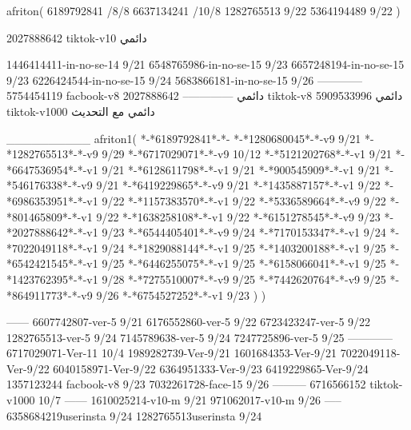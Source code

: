 afriton(
6189792841 /8/8
6637134241 /10/8
1282765513 9/22
5364194489 9/22
)

2027888642 tiktok-v10
دائمي



1446414411-in-no-se-14 9/21
6548765986-in-no-se-15 9/23
6657248194-in-no-se-15 9/23
6226424544-in-no-se-15 9/24
5683866181-in-no-se-15 9/26
------------
5754454119 facbook-v8
دائمي
--------------
2027888642 tiktok-v8
دائمي
5909533996 tiktok-v1000
دائمي مع التحديث

__________
afriton1(
*-*6189792841*-*-
*-*1280680045*-*-v9 9/21
*-*1282765513*-*-v9 9/29
*-*6717029071*-*-v9 10/12
*-*5121202768*-*-v1 9/21
*-*6647536954*-*-v1 9/21
*-*6128611798*-*-v1 9/21
*-*900545909*-*-v1 9/21
*-*546176338*-*-v9 9/21
*-*6419229865*-*-v9 9/21
*-*1435887157*-*-v1 9/22
*-*6986353951*-*-v1 9/22
*-*1157383570*-*-v1 9/22
*-*5336589664*-*-v9 9/22
*-*801465809*-*-v1 9/22
*-*1638258108*-*-v1 9/22
*-*6151278545*-*-v9 9/23
*-*2027888642*-*-v1 9/23
*-*6544405401*-*-v9 9/24
*-*7170153347*-*-v1 9/24
*-*7022049118*-*-v1 9/24
*-*1829088144*-*-v1 9/25
*-*1403200188*-*-v1 9/25
*-*6542421545*-*-v1 9/25
*-*6446255075*-*-v1 9/25
*-*6158066041*-*-v1 9/25
*-*1423762395*-*-v1 9/28
*-*7275510007*-*-v9 9/25
*-*7442620764*-*-v9 9/25
*-*864911773*-*-v9 9/26
*-*6754527252*-*-v1 9/23
)
)

------
6607742807-ver-5 9/21
6176552860-ver-5 9/22
6723423247-ver-5 9/22
1282765513-ver-5 9/24
7145789638-ver-5 9/24
7247725896-ver-5 9/25
------------
6717029071-Ver-11
10/4
1989282739-Ver-9/21
1601684353-Ver-9/21
7022049118-Ver-9/22
6040158971-Ver-9/22
6364951333-Ver-9/23
6419229865-Ver-9/24
1357123244 facbook-v8 9/23
7032261728-face-15 9/26
---------
6716566152 tiktok-v1000
10/7
------
1610025214-v10-m 9/21
971062017-v10-m 9/26
-----
6358684219userinsta 9/24
1282765513userinsta 9/24
